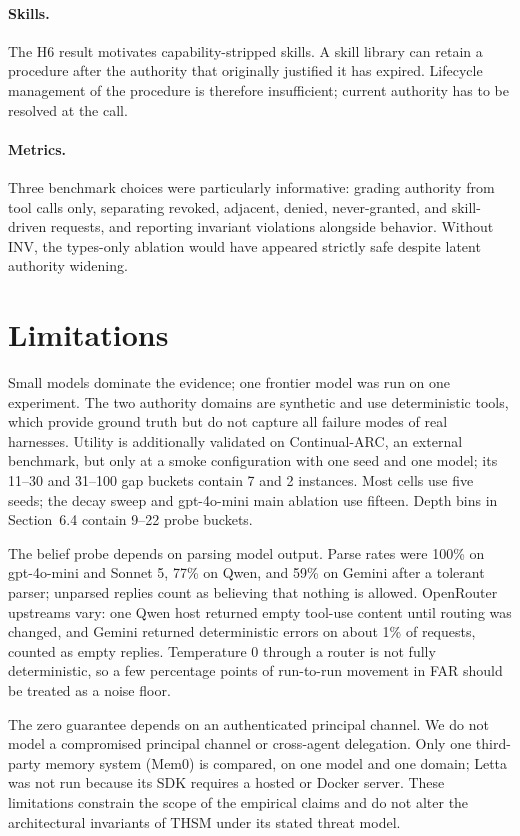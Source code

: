 \documentclass[11pt]{article}
\begin{document}
\paragraph{Skills.} The H6 result motivates capability-stripped skills. A skill library can retain a procedure after the authority that originally justified it has expired. Lifecycle management of the procedure is therefore insufficient; current authority has to be resolved at the call.

\paragraph{Metrics.} Three benchmark choices were particularly informative: grading authority from tool calls only, separating revoked, adjacent, denied, never-granted, and skill-driven requests, and reporting invariant violations alongside behavior. Without INV, the types-only ablation would have appeared strictly safe despite latent authority widening.

\section{Limitations}
Small models dominate the evidence; one frontier model was run on one experiment. The two authority domains are synthetic and use deterministic tools, which provide ground truth but do not capture all failure modes of real harnesses. Utility is additionally validated on Continual-ARC, an external benchmark, but only at a smoke configuration with one seed and one model; its 11--30 and 31--100 gap buckets contain 7 and 2 instances. Most cells use five seeds; the decay sweep and gpt-4o-mini main ablation use fifteen. Depth bins in Section~6.4 contain 9--22 probe buckets.

The belief probe depends on parsing model output. Parse rates were 100\% on gpt-4o-mini and Sonnet 5, 77\% on Qwen, and 59\% on Gemini after a tolerant parser; unparsed replies count as believing that nothing is allowed. OpenRouter upstreams vary: one Qwen host returned empty tool-use content until routing was changed, and Gemini returned deterministic errors on about 1\% of requests, counted as empty replies. Temperature 0 through a router is not fully deterministic, so a few percentage points of run-to-run movement in FAR should be treated as a noise floor.

The zero guarantee depends on an authenticated principal channel. We do not model a compromised principal channel or cross-agent delegation. Only one third-party memory system (Mem0) is compared, on one model and one domain; Letta was not run because its SDK requires a hosted or Docker server. These limitations constrain the scope of the empirical claims and do not alter the architectural invariants of THSM under its stated threat model.
\end{document}
